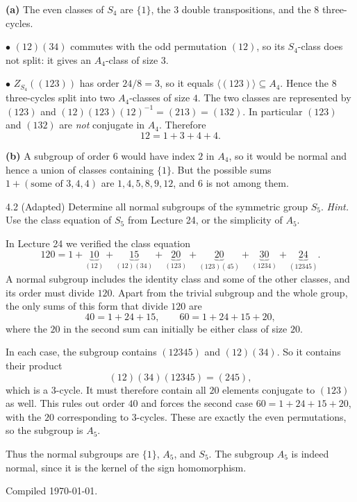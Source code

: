 \documentclass[11pt]{article}
\begin{document}
\begin{solution}
\textbf{(a)} The even classes of $S_4$ are $\{1\}$, the $3$ double
 transpositions, and the $8$ three-cycles.

$\bullet$ $(12)(34)$ commutes with the odd permutation $(12)$, so its
$S_4$-class does not split: it gives an $A_4$-class of size $3$.

$\bullet$ $Z_{S_4}((123))$ has order $24/8=3$, so it equals
$\langle(123)\rangle\subseteq A_4$. Hence the $8$ three-cycles split into two
$A_4$-classes of size $4$. The two classes are represented by $(123)$ and
$(12)(123)(12)^{-1}=(213)=(132)$. In particular $(123)$ and $(132)$ are
\emph{not} conjugate in $A_4$. Therefore
\[
  12=1+3+4+4.
\]

\textbf{(b)} A subgroup of order $6$ would have index $2$ in $A_4$, so it
 would be normal and hence a union of classes containing $\{1\}$. But the
 possible sums $1+(\text{some of }3,4,4)$ are $1,4,5,8,9,12$, and $6$ is not
 among them.
\end{solution}

\begin{exercise}{4.2 (Adapted)}
Determine all normal subgroups of the symmetric group $S_5$.
\textit{Hint.} Use the class equation of $S_5$ from Lecture 24, or the
simplicity of $A_5$.
\end{exercise}

\begin{solution}
In Lecture 24 we verified the class equation
\[
  120=1+\underbrace{10}_{(12)}+\underbrace{15}_{(12)(34)}
  +\underbrace{20}_{(123)}+\underbrace{20}_{(123)(45)}
  +\underbrace{30}_{(1234)}+\underbrace{24}_{(12345)}.
\]
A normal subgroup includes the identity class and some of the other
classes, and its order must divide $120$. Apart from the trivial
subgroup and the whole group, the only sums of this form that divide
$120$ are
\[
  40=1+24+15,\qquad 60=1+24+15+20,
\]
where the $20$ in the second sum can initially be either class of size $20$.

In each case, the subgroup contains $(12345)$ and $(12)(34)$.
So it contains their product
\[
  (12)(34)(12345)=(245),
\]
which is a $3$-cycle. It must therefore contain all $20$ elements
conjugate to $(123)$ as well. This rules out order $40$ and forces
the second case $60=1+24+15+20$, with the $20$ corresponding to
$3$-cycles. These are exactly the even permutations, so the subgroup
is $A_5$.

Thus the normal subgroups are $\{1\}$, $A_5$, and $S_5$.
The subgroup $A_5$ is indeed normal, since it is the kernel of the sign
homomorphism.
\end{solution}

\vfill
{\small\color{darkgray}Compiled \today.}
\end{document}
